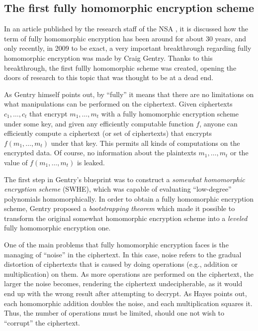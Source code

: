 \subsection{The first fully homomorphic encryption scheme}

In an article published by the research staff of the NSA \cite{NSA2014}, it is discussed how the term of fully homomorphic encryption has been around for about 30 years, and only recently, in 2009 to be exact, a very important breakthrough regarding fully homomorphic encryption was made by Craig Gentry. Thanks to this breakthrough, the first fullly homomorphic scheme was created, opening the doors of research to this topic that was thought to be at a dead end. 

As Gentry \cite{homoenc} himself points out, by ``fully'' it means that there are no limitations on what manipulations can be performed on the ciphertext. Given ciphertexts $c_{1}, \dots, c_{t}$ that encrypt $m_{1}, \dots, m_{t}$ with a fully homomorphic encryption scheme under some key, and given any efficiently computable function $f$, anyone can efficiently compute a ciphertext (or set of ciphertexts) that encrypts $f(m_{1}, \dots, m_{t})$ under that key. This permits all kinds of computations on the encrypted data. Of course, no information about the plaintexts $m_{1}, \dots, m_{t}$ or the value of $f(m_{1}, \dots, m_{t})$ is leaked. 

The first step in Gentry's blueprint was to construct a \emph{somewhat homomorphic encryption scheme} (SWHE), which was capable of evaluating ``low-degree'' polynomials homomorphically. In order to obtain a fully homomorphic encryption scheme, Gentry proposed a \emph{bootstrapping theorem} which made it possible to transform the original somewhat homomorphic encryption scheme into a \emph{leveled} fully homomorphic encryption one.

One of the main problems that fully homomorphic encryption faces is the managing of ``noise'' in the ciphertext. In this case, noise refers to the gradual distortion of ciphertexts that is caused by doing operations (e.g., addition or multiplication) on them. As more operations are performed on the ciphertext, the larger the noise becomes, rendering the ciphertext undecipherable, as it would end up with the wrong result after attempting to decrypt. As Hayes \cite{Hayes2012} points out, each homomorphic addition doubles the noise, and each multiplication squares it. Thus, the number of operations must be limited, should one not wish to ``corrupt'' the ciphertext. 

